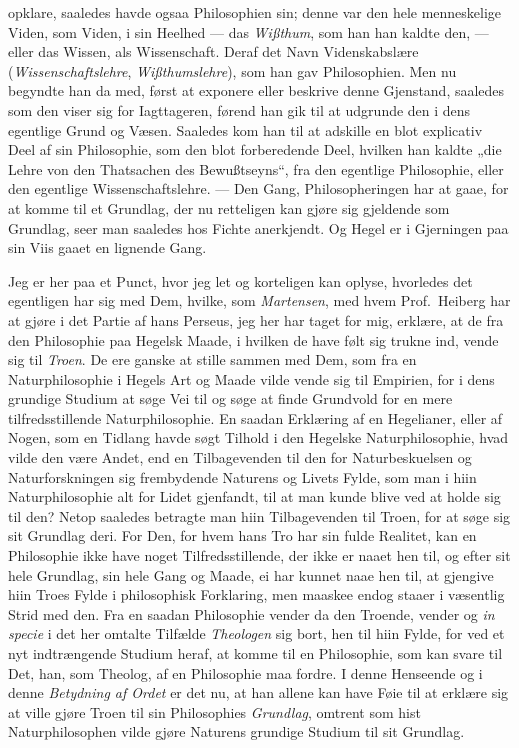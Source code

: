 \documentclass[12pt,a4paper]{book}
\newcommand{\apage}[1]{\marginnote{\footnotesize\textit{[#1]}}}
\begin{document}
opklare, saaledes havde ogsaa Philosophien sin; denne var den hele
menneskelige \apage{58} Viden, som Viden, i sin Heelhed --- das \emph{Wißthum}, som han
han kaldte den,
--- eller das Wissen, als Wissenschaft. Deraf det Navn Videnskabslære
(\emph{Wissenschaftslehre}, \emph{Wißthumslehre}), som han gav Philosophien. Men nu
begyndte han da med, først at exponere eller beskrive denne Gjenstand,
saaledes som den viser sig for Iagttageren, førend han gik til at
udgrunde den i dens egentlige Grund og Væsen. Saaledes kom han til at
adskille en blot explicativ Deel af sin Philosophie, som den blot
forberedende Deel, hvilken han kaldte „die Lehre von den Thatsachen des
Bewußtseyns“, fra den egentlige Philosophie, eller den egentlige
Wissenschaftslehre. --- Den Gang, Philosopheringen har at gaae, for at
komme til et Grundlag, der nu retteligen kan gjøre sig gjeldende som
Grundlag, seer man saaledes hos Fichte anerkjendt. Og Hegel er i
Gjerningen paa sin Viis gaaet en lignende Gang.

%
Jeg er her paa et Punct, hvor jeg let og korteligen kan oplyse,
hvorledes det egentligen har sig med Dem, hvilke, som \emph{Martensen}, med
hvem Prof.\ Heiberg har at gjøre i det Partie af hans Perseus, jeg her
har taget for mig, erklære, at de fra den Philosophie paa Hegelsk
Maade, i hvilken de have følt sig trukne ind, vende sig til \emph{Troen}. De
ere ganske at stille sammen med Dem, som fra en Naturphilosophie i
Hegels Art og Maade vilde vende sig til Empirien, for i dens grundige
Studium at søge Vei til og søge at finde Grundvold for en mere
tilfredsstillende Naturphilosophie. En saadan Erklæring af en
Hegelianer, eller af Nogen, som en Tidlang havde søgt Tilhold i den
Hegelske Naturphilosophie, hvad vilde den være Andet, end en
Tilbagevenden til den for Naturbeskuelsen og Naturforskningen sig
frembydende Naturens og Livets Fylde, som man i hiin Naturphilosophie
alt for Lidet gjenfandt, til at man kunde blive ved at holde sig til
den? Netop saaledes betragte man hiin Tilbagevenden til Troen, for at
søge sig sit Grundlag deri. For Den, for hvem hans Tro har sin fulde
Realitet, kan en \apage{59} Philosophie ikke have noget Tilfredsstillende, der
ikke er naaet hen til, og efter sit hele Grundlag, sin hele Gang og
Maade, ei har kunnet naae hen til, at gjengive hiin Troes Fylde i
philosophisk Forklaring, men maaskee endog staaer i væsentlig Strid med
den. Fra en saadan Philosophie vender da den Troende, vender og
\textit{in specie} i det her omtalte Tilfælde \emph{Theologen} sig bort, hen
til hiin Fylde, for ved et nyt indtrængende Studium heraf, at komme til
en Philosophie, som kan svare til Det, han, som Theolog, af en
Philosophie maa fordre. I denne Henseende og i denne \emph{Betydning af Ordet}
er det nu, at han allene kan have Føie til at erklære sig at ville gjøre
Troen til sin Philosophies \emph{Grundlag}, omtrent som hist Naturphilosophen
vilde gjøre Naturens grundige Studium til sit Grundlag.
\end{document}
